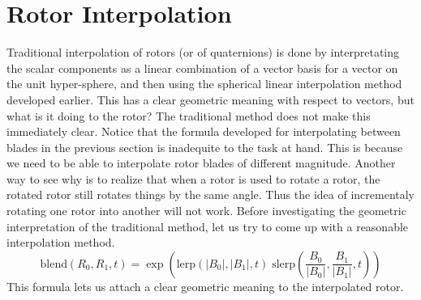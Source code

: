 \documentclass{article}
\begin{document}
\section*{Rotor Interpolation}

Traditional interpolation of rotors (or of quaternions) is done
by interpretating the scalar components as a linear combination
of a vector basis for a vector on the unit hyper-sphere, and then using the spherical
linear interpolation method developed earlier.  This has a clear geometric
meaning with respect to vectors, but what is it doing to the rotor?
The traditional method does not make this immediately clear.
Notice that the formula developed for interpolating between blades
in the previous section is inadequite to the task at hand.  This is
because we need to be able to interpolate rotor blades of different magnitude.
Another way to see why is to realize that when a rotor is used to rotate a rotor,
the rotated rotor still rotates things by the same angle.  Thus the idea of
incrementaly rotating one rotor into another will not work.
Before investigating the geometric interpretation of the traditional method, let
us try to come up with a reasonable interpolation method.
\begin{equation*}
\mbox{blend}(R_0,R_1,t) = \exp\left(\mbox{lerp}(|B_0|,|B_1|,t)\;
\mbox{slerp}\left(\frac{B_0}{|B_0|},\frac{B_1}{|B_1|},t\right)\right)
\end{equation*}
This formula lets us attach a clear geometric meaning to the interpolated rotor.
\end{document}
